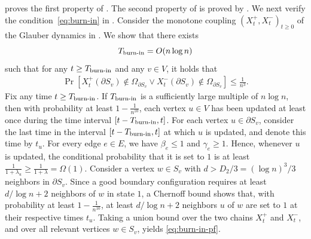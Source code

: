 \documentclass[11pt]{amsart}
\renewcommand{\Pr}{\mathop{\mathrm{Pr}}\nolimits}
\theoremstyle{definition}
\theoremstyle{remark}
\begin{document}
 proves the first property of . The second property of  is proved by . 
We next verify the condition~\eqref{eq:burn-in} in .
Consider the monotone coupling $(X_t^+,X_t^-)_{t \geq 0}$ of the Glauber dynamics in . %
We show that there exists
\[
T_{\textnormal{burn-in}} = O(n \log n)
\]
such that for any $t \geq T_{\textnormal{burn-in}}$ and any $v \in V$, it holds that
\begin{align}\label{eq:burn-in-pf}
     \Pr[X^+_t(\partial S_v) \notin \Omega_{\partial S_v} \lor X^-_t(\partial S_v) \notin \Omega_{\partial S_v}] \leq \frac{1}{n^3}.
\end{align}
Fix any time $t \geq T_{\textnormal{burn-in}}$. If $T_{\textnormal{burn-in}}$ is a sufficiently large multiple of $n \log n$, then with probability at least $1 - \frac{1}{n^{10}}$, each vertex $u \in V$ has been updated at least once during the time interval $[t-T_{\textnormal{burn-in}},t]$. 
For each vertex $u \in \partial S_v$, consider the last time in the interval $[t-T_{\textnormal{burn-in}},t]$ at which $u$ is updated, and denote this time by $t_u$. 
For every edge $e \in E$, we have $\beta_e \leq 1$ and $\gamma_e \geq 1$. Hence, whenever $u$ is updated, the conditional probability that it is set to $1$ is at least $\frac{1}{1+\lambda_u} \geq \frac{1}{1+\lambda} = \Omega(1)$. Consider a vertex $w \in S_v$ with $d > D_2 / 3 = (\log n)^3 / 3$ neighbors in $\partial S_v$. Since a good boundary configuration requires at least $d/\log n+2$ neighbors of $w$ in state $1$, a Chernoff bound shows that, with probability at least $1 - \frac{1}{n^{10}}$, at least $d/\log n + 2$ neighbors $u$ of $w$ are set to $1$ at their respective times $t_u$. Taking a union bound over the two chains $X^+_t$ and $X^-_t$, and over all relevant vertices $w \in S_v$, yields \eqref{eq:burn-in-pf}.
\end{document}
